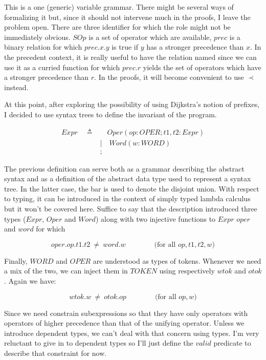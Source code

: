\documentclass[10pt]{report}
\begin{document}
This is a one (generic) variable grammar.  There might be several ways of formalizing it but, since it should not intervene much in the proofs, I leave the problem open.  There are three identifier for which the role might not be immediately obvious.  $SOp$ is a set of operator which are available, $prec$ is a binary relation for which $prec.x.y$ is true if $y$ has a stronger precedence than $x$.  In the precedent context, it is really useful to have the relation named since we can use it as a curried function for which $prec.r$ yields the set of operators which have a stronger precedence than $r$.  In the proofs, it will become convenient to use $\prec$ instead.

At this point, after exploring the possibility of using Dijkstra's notion of prefixes, I decided to use syntax trees to define the invariant of the program.

\begin{align}
	Expr \quad \triangleq & \quad Oper (op: OPER; t1, t2: Expr) \label{asyntax} \\
		& | \quad Word (w: WORD) \nonumber \\
		& ; \nonumber
\end{align}

The previous definition can serve both as a grammar describing the abstract syntax and as a definition of the abstract data type used to represent a syntax tree.  In the latter case, the bar is used to denote the disjoint union.  With respect to typing, it can be introduced in the context of simply typed lambda calculus but it won't be covered here.  Suffice to say that the description introduced three types ($Expr$, $Oper$ and $Word$) along with two injective functions to $Expr$ $oper$ and $word$ for which

\begin{equation}
	oper.op.t1.t2 \ \neq \ word.w \qquad \qquad \text{(for all $op, t1, t2, w$)}
\end{equation} 

Finally, $WORD$ and $OPER$ are understood as types of tokens.  Whenever we need a mix of the two, we can inject them in $TOKEN$ using respectively $wtok$ and $otok$.  Again we have:

\begin{equation}
	wtok.w \ \neq \ otok.op \qquad \qquad \text{(for all $op, w$)}
\end{equation}

Since we need constrain subexpressions so that they have only operators with operators of higher precedence than that of the unifying operator.  Unless we introduce dependent types, we can't deal with that concern using types.  I'm very reluctant to give in to dependent types so I'll just define the $valid$ predicate to describe that constraint for now.
\end{document}
